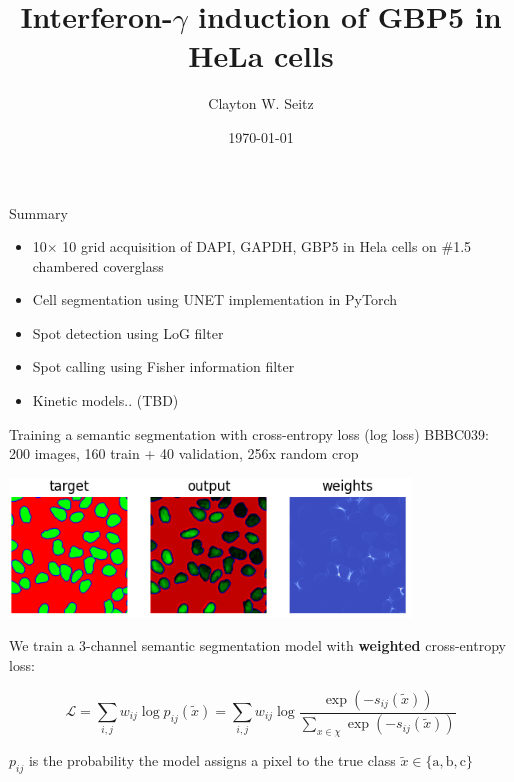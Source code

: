 \documentclass[aspectratio=1610]{beamer}					%
\title{Interferon-$\gamma$ induction of GBP5 in HeLa cells}	%
\author{Clayton W. Seitz}								%
\date{\today}									%
\begin{document}
\begin{frame}
  \titlepage
\end{frame}


%

\begin{frame}{Summary}
\begin{itemize}
\item 10$\times$ 10 grid acquisition of DAPI, GAPDH, GBP5 in Hela cells on \#1.5 chambered coverglass
\item Cell segmentation using UNET implementation in PyTorch
\item Spot detection using LoG filter
\item Spot calling using Fisher information filter
\item Kinetic models.. (TBD)
\end{itemize}
\end{frame}


\begin{frame}{Training a semantic segmentation with cross-entropy loss (log loss)}
\vspace{0.1in}
BBBC039: 200 images, 160 train + 40 validation, 256\;x random crop

\begin{center}
\includegraphics[width=0.8\textwidth]{weights.png}
\end{center}

We train a 3-channel semantic segmentation model with \textbf{weighted} cross-entropy loss:

\begin{equation*}
\mathcal{L} = \sum_{i,j} w_{ij}\log p_{ij}(\tilde{x}) = \sum_{i,j} w_{ij}\log \frac{\exp(-s_{ij}(\tilde{x}))}{\sum_{x\in\chi} \exp(-s_{ij}(\tilde{x}))}
\end{equation*}

$p_{ij}$ is the probability the model assigns a pixel to the true class $\tilde{x} \in \{\textrm{a}, \textrm{b}, \textrm{c}\}$

\end{frame}
\end{document}
